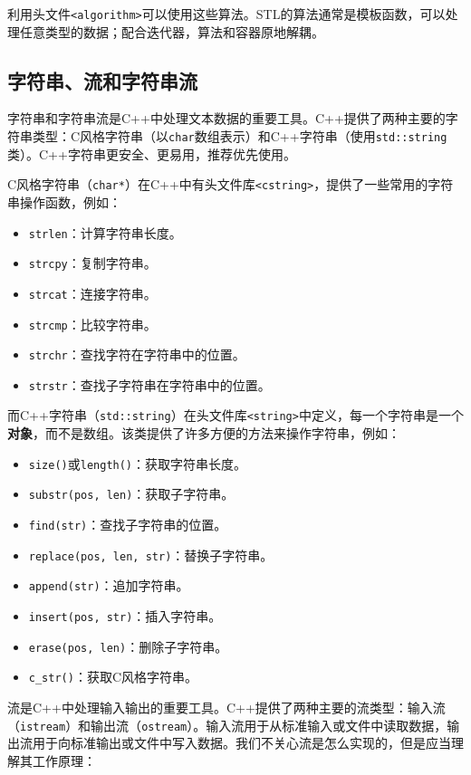 利用头文件\texttt{<algorithm>}可以使用这些算法。STL的算法通常是模板函数，可以处理任意类型的数据；配合迭代器，算法和容器原地解耦。

\subsection{字符串、流和字符串流}

字符串和字符串流是C++中处理文本数据的重要工具。C++提供了两种主要的字符串类型：C风格字符串（以\texttt{char}数组表示）和C++字符串（使用\texttt{std::string}类）。C++字符串更安全、更易用，推荐优先使用。

C风格字符串（\texttt{char*}）在C++中有头文件库\texttt{<cstring>}，提供了一些常用的字符串操作函数，例如：
\begin{itemize}
  \item \texttt{strlen}：计算字符串长度。
  \item \texttt{strcpy}：复制字符串。
  \item \texttt{strcat}：连接字符串。
  \item \texttt{strcmp}：比较字符串。
  \item \texttt{strchr}：查找字符在字符串中的位置。
  \item \texttt{strstr}：查找子字符串在字符串中的位置。
\end{itemize}

而C++字符串（\texttt{std::string}）在头文件库\texttt{<string>}中定义，每一个字符串是一个\textbf{对象}，而不是数组。该类提供了许多方便的方法来操作字符串，例如：
\begin{itemize}
  \item \texttt{size()}或\texttt{length()}：获取字符串长度。
  \item \texttt{substr(pos, len)}：获取子字符串。
  \item \texttt{find(str)}：查找子字符串的位置。
  \item \texttt{replace(pos, len, str)}：替换子字符串。
  \item \texttt{append(str)}：追加字符串。
  \item \texttt{insert(pos, str)}：插入字符串。
  \item \texttt{erase(pos, len)}：删除子字符串。
  \item \texttt{c\_str()}：获取C风格字符串。
\end{itemize}

流是C++中处理输入输出的重要工具。C++提供了两种主要的流类型：输入流（\texttt{istream}）和输出流（\texttt{ostream}）。输入流用于从标准输入或文件中读取数据，输出流用于向标准输出或文件中写入数据。我们不关心流是怎么实现的，但是应当理解其工作原理：

